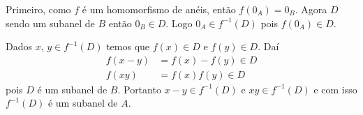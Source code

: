\documentclass[12pt]{article}
\begin{document}
Primeiro, como $f$ é um homomorfismo de anéis, então $f(0_A) = 0_B$. Agora $D$ sendo um subanel de $B$ então $0_B \in D$. Logo $0_A \in f^{-1}(D)$ pois $f(0_A) \in D$.

Dados $x$, $y \in f^{-1}(D)$ temos que $f(x) \in D$ e $f(y) \in D$. Daí
\begin{align*}
	f(x - y) &= f(x) - f(y) \in D\\
	f(xy) &= f(x)f(y) \in D
\end{align*}
pois $D$ é um subanel de $B$. Portanto $x - y \in f^{-1}(D)$ e $xy \in f^{-1}(D)$ e com isso $f^{-1}(D)$ é um subanel de $A$.
\end{document}
